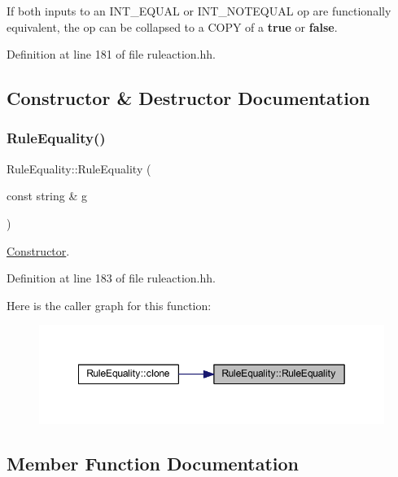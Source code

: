 If both inputs to an I\+N\+T\+\_\+\+E\+Q\+U\+AL or I\+N\+T\+\_\+\+N\+O\+T\+E\+Q\+U\+AL op are functionally equivalent, the op can be collapsed to a C\+O\+PY of a {\bfseries{true}} or {\bfseries{false}}. 

Definition at line 181 of file ruleaction.\+hh.



\subsection{Constructor \& Destructor Documentation}
\mbox{\label{class_rule_equality_a554613610cb9bcb4d8f8e66aad56fb69}} 
\subsubsection{\texorpdfstring{RuleEquality()}{RuleEquality()}}
{\footnotesize\ttfamily Rule\+Equality\+::\+Rule\+Equality (\begin{DoxyParamCaption}\item[{const string \&}]{g }\end{DoxyParamCaption})\hspace{0.3cm}{\ttfamily [inline]}}



\mbox{\hyperlink{class_constructor}{Constructor}}. 



Definition at line 183 of file ruleaction.\+hh.

Here is the caller graph for this function\+:
\nopagebreak
\begin{figure}[H]
\begin{center}
\leavevmode
\includegraphics[width=349pt]{class_rule_equality_a554613610cb9bcb4d8f8e66aad56fb69_icgraph}
\end{center}
\end{figure}


\subsection{Member Function Documentation}
\mbox{\label{class_rule_equality_a1eec6d7734884df00533e207ead6de4b}} 
